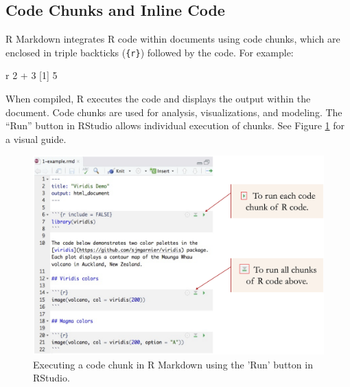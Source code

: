 \documentclass[
  11pt,
]{book}
\makeatletter
\newenvironment{Shaded}{}{}
\newcommand{\DecValTok}[1]{#1}
\newcommand{\InformationTok}[1]{\textcolor[rgb]{0.36,0.36,0.36}{#1}}
\newcommand{\NormalTok}[1]{#1}
\newcommand{\SpecialCharTok}[1]{\textcolor[rgb]{0.39,0.39,0.39}{#1}}
\newenvironment{kframe}{%
\medskip{}
\setlength{\fboxsep}{.8em}
 \def\at@end@of@kframe{}%
 \ifinner\ifhmode%
  \def\at@end@of@kframe{\end{minipage}}%
  \begin{minipage}{\columnwidth}%
 \fi\fi%
 \def\FrameCommand##1{\hskip\@totalleftmargin \hskip-\fboxsep
 \colorbox{shadecolor}{##1}\hskip-\fboxsep
     \hskip-\linewidth \hskip-\@totalleftmargin \hskip\columnwidth}%
 \MakeFramed {\advance\hsize-\width
   \@totalleftmargin\z@ \linewidth\hsize
   \@setminipage}}%
 {\par\unskip\endMakeFramed%
 \at@end@of@kframe}
\renewenvironment{Shaded}{\begin{kframe}}{\end{kframe}}
\theoremstyle{definition}
\theoremstyle{definition}
\theoremstyle{definition}
\theoremstyle{definition}
\theoremstyle{remark}
\makeatother
\begin{document}
\subsection*{Code Chunks and Inline Code}\label{code-chunks-and-inline-code}


R Markdown integrates R code within documents using code chunks, which are enclosed in triple backticks (\texttt{\textasciigrave{}\textasciigrave{}\textasciigrave{}\{r\}}) followed by the code. For example:

\begin{Shaded}
\begin{Highlighting}[]

\InformationTok{\textasciigrave{}\textasciigrave{}\textasciigrave{} r}
\DecValTok{2} \SpecialCharTok{+} \DecValTok{3}
\NormalTok{   [}\DecValTok{1}\NormalTok{] }\DecValTok{5}
\InformationTok{\textasciigrave{}\textasciigrave{}\textasciigrave{}}
\end{Highlighting}
\end{Shaded}

When compiled, R executes the code and displays the output within the document. Code chunks are used for analysis, visualizations, and modeling. The ``Run'' button in RStudio allows individual execution of chunks. See Figure \ref{fig:run-chunk} for a visual guide.

\begin{figure}[H]

{\centering \includegraphics[width=0.9\linewidth]{images/ch1_run-chunk} 

}

\caption{Executing a code chunk in R Markdown using the 'Run' button in RStudio.}\label{fig:run-chunk}
\end{figure}
\end{document}
